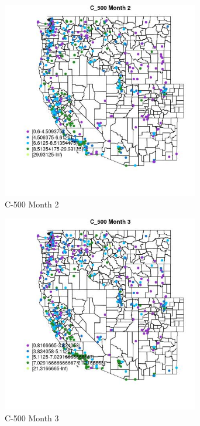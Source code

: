 \begin{figure} 
\centering  
\includegraphics[width=0.77\textwidth]{Code_Outputs/ML_input_report_ML_input_PM25_Step5_part_d_de_duplicated_aves_ML_input_MapObsMo2C_500.jpg} 
\caption{\label{fig:ML_input_report_ML_input_PM25_Step5_part_d_de_duplicated_aves_ML_inputMapObsMo2C_500}C-500 Month 2} 
\end{figure} 
 

\begin{figure} 
\centering  
\includegraphics[width=0.77\textwidth]{Code_Outputs/ML_input_report_ML_input_PM25_Step5_part_d_de_duplicated_aves_ML_input_MapObsMo3C_500.jpg} 
\caption{\label{fig:ML_input_report_ML_input_PM25_Step5_part_d_de_duplicated_aves_ML_inputMapObsMo3C_500}C-500 Month 3} 
\end{figure} 
 

